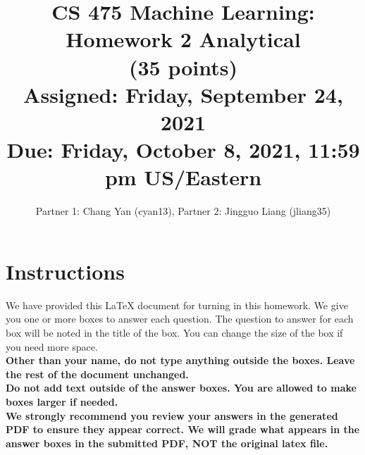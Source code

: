 \documentclass[11pt]{article}
\title{CS 475 Machine Learning: Homework 2 Analytical \\
(35 points)\\
\Large{Assigned: Friday, September 24, 2021} \\
\Large{Due: Friday, October 8, 2021, 11:59 pm US/Eastern}}
\author{Partner 1: Chang Yan (cyan13), Partner 2:  Jingguo Liang (jliang35)}
\date{}
\renewcommand{\vec}[1]{\mathbf{#1}}
\begin{document}
\maketitle
\thispagestyle{headings}

\section*{Instructions }
We have provided this \LaTeX{} document for turning in this homework. We give you one or more boxes to answer each question.  The question to answer for each box will be noted in the title of the box.  You can change the size of the box if you need more space.\\

{\bf Other than your name, do not type anything outside the boxes. Leave the rest of the document unchanged.}\\


\textbf{
  Do
  not add text outside of the answer boxes.  You are allowed to make boxes larger if needed.
  }\\


\textbf{We strongly recommend you review your answers in the generated PDF to
  ensure they appear correct. We will grade what appears in the answer boxes in
  the submitted PDF, NOT the original latex file.}

\end{document}
